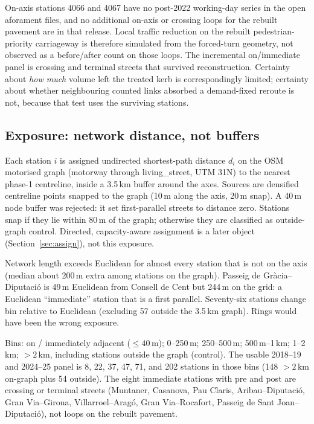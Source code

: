 \documentclass[a4paper,fleqn]{cas-dc}
\begin{document}
On-axis stations 4066 and 4067 have no post-2022 working-day series in the
open aforament files, and no additional on-axis or crossing loops for the
rebuilt pavement are in that release. Local traffic reduction on the rebuilt
pedestrian-priority carriageway is therefore simulated from the forced-turn
geometry, not observed as a before/after count on those loops. The incremental on/immediate panel is crossing and terminal
streets that survived reconstruction. Certainty about \emph{how much} volume
left the treated kerb is correspondingly limited; certainty about whether
neighbouring counted links absorbed a demand-fixed reroute is not, because
that test uses the surviving stations.

\subsection{Exposure: network distance, not buffers}

Each station $i$ is assigned undirected shortest-path distance $d_i$ on the
OSM motorised graph (motorway through living\_street, UTM 31N) to the nearest
phase-1 centreline, inside a 3.5\,km buffer around the axes. Sources are
densified centreline points snapped to the graph (10\,m along the axis, 20\,m
snap). A 40\,m node buffer was rejected: it set first-parallel streets to
distance zero. Stations snap if they lie within 80\,m of the graph; otherwise
they are classified as outside-graph control. Directed, capacity-aware
assignment is a later object (Section~\ref{sec:assign}), not this exposure.

Network length exceeds Euclidean for almost every station that is not on the
axis (median about 200\,m extra among stations on the graph). Passeig de
Gr\`acia--Diputaci\'o is 49\,m Euclidean from Consell de Cent but 244\,m on
the grid: a Euclidean ``immediate'' station that is a first parallel.
Seventy-six stations change bin relative to Euclidean (excluding 57 outside
the 3.5\,km graph). Rings would have been the wrong exposure.

Bins: on / immediately adjacent ($\le 40$\,m); 0--250\,m; 250--500\,m;
500\,m--1\,km; 1--2\,km; $>2$\,km, including stations outside the graph
(control). The usable 2018--19 and 2024--25 panel is 8, 22, 37, 47, 71, and
202 stations in those bins (148 $>2$\,km on-graph plus 54 outside). The eight
immediate stations with pre and post are crossing or terminal streets
(Muntaner, Casanova, Pau Claris, Aribau--Diputaci\'o, Gran Via--Girona,
Villarroel--Arag\'o, Gran Via--Rocafort, Passeig de Sant Joan--Diputaci\'o),
not loops on the rebuilt pavement.
\end{document}
